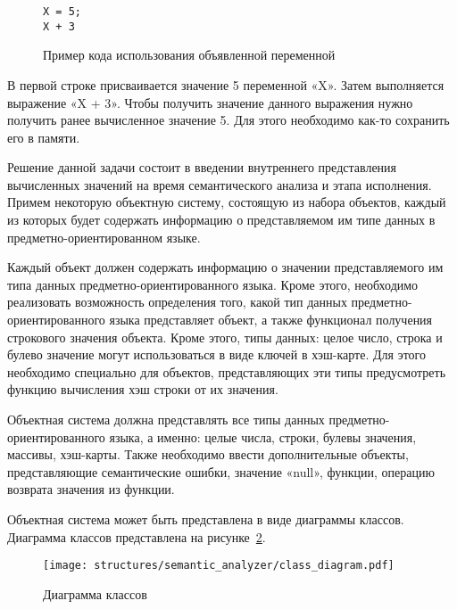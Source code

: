 \begin{figure}[ht]
	\centering
	\vspace{\toppaddingoffigure}
	\begin{lstlisting}
X = 5;
X + 3
\end{lstlisting}
	\caption{Пример кода использования объявленной переменной}
	\label{f:code_example_var}
\end{figure}

В первой строке присваивается значение 5 переменной «X».
Затем выполняется выражение «X + 3».
Чтобы получить значение данного выражения нужно получить ранее вычисленное значение 5.
Для этого необходимо как-то сохранить его в памяти.

Решение данной задачи состоит в введении внутреннего представления вычисленных значений на время семантического анализа и этапа исполнения.
Примем некоторую объектную систему, состоящую из набора объектов, каждый из которых будет содержать информацию о представляемом им типе данных в предметно-ориентированном языке.

Каждый объект должен содержать информацию о значении представляемого им типа данных предметно-ориентированного языка.
Кроме этого, необходимо реализовать возможность определения того, какой тип данных предметно-ориентированного языка представляет объект, а также функционал получения строкового значения объекта.
Кроме этого, типы данных: целое число, строка и булево значение могут использоваться в виде ключей в хэш-карте.
Для этого необходимо специально для объектов, представляющих эти типы предусмотреть функцию вычисления хэш строки от их значения. 

Объектная система должна представлять все типы данных предметно-ориентированного языка, а именно:
целые числа, строки, булевы значения, массивы, хэш-карты.
Также необходимо ввести дополнительные объекты, представляющие семантические ошибки, значение «null», функции, операцию возврата значения из функции.

Объектная система может быть представлена в виде диаграммы классов.
Диаграмма классов представлена на рисунке~\ref{f:class_diagram}.

\clearpage

\begin{figure}[!htp]
	\centering
    \vspace{\toppaddingoffigure}
	\texttt{[image: structures/semantic\_analyzer/class\_diagram.pdf]}
	\caption{Диаграмма классов}
	\label{f:class_diagram}
\end{figure}

